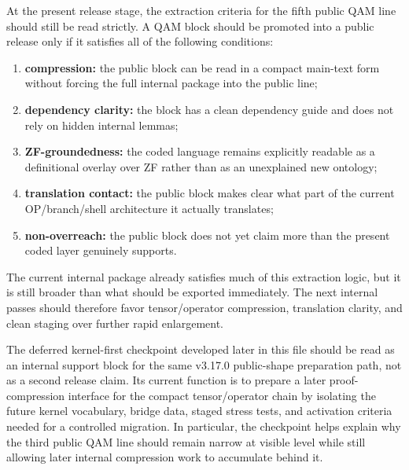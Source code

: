 At the present release stage, the extraction criteria for the fifth public QAM line should still be read strictly. A QAM block should be promoted into a public release only if it satisfies all of the following conditions:
\begin{enumerate}[leftmargin=2em]
  \item \textbf{compression:} the public block can be read in a compact main-text form without forcing the full internal package into the public line;
  \item \textbf{dependency clarity:} the block has a clean dependency guide and does not rely on hidden internal lemmas;
  \item \textbf{ZF-groundedness:} the coded language remains explicitly readable as a definitional overlay over ZF rather than as an unexplained new ontology;
  \item \textbf{translation contact:} the public block makes clear what part of the current OP/branch/shell architecture it actually translates;
  \item \textbf{non-overreach:} the public block does not yet claim more than the present coded layer genuinely supports.
\end{enumerate}

\begin{remark}
The current internal package already satisfies much of this extraction logic, but it is still broader than what should be exported immediately. The next internal passes should therefore favor tensor/operator compression, translation clarity, and clean staging over further rapid enlargement.
\end{remark}

\begin{remark}\label{rem:qam-roadmap-checkpoint-fit}
The deferred kernel-first checkpoint developed later in this file should be read as an internal support block for the same v3.17.0 public-shape preparation path, not as a second release claim. Its current function is to prepare a later proof-compression interface for the compact tensor/operator chain by isolating the future kernel vocabulary, bridge data, staged stress tests, and activation criteria needed for a controlled migration. In particular, the checkpoint helps explain why the third public QAM line should remain narrow at visible level while still allowing later internal compression work to accumulate behind it.
\end{remark}

